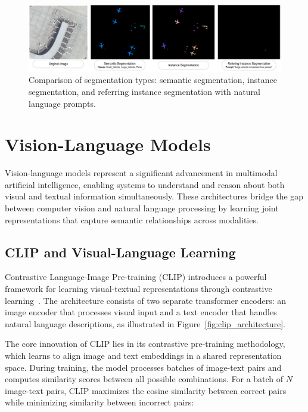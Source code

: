 \begin{figure}[htbp]
\centering
\includegraphics[width=1.0\textwidth]{Images/segmentation.png}
\caption{Comparison of segmentation types: semantic segmentation, instance segmentation, and referring instance segmentation with natural language prompts.}
\label{fig:segmentation}
\end{figure}

\section{Vision-Language Models}

Vision-language models represent a significant advancement in multimodal artificial intelligence, enabling systems to understand and reason about both visual and textual information simultaneously. These architectures bridge the gap between computer vision and natural language processing by learning joint representations that capture semantic relationships across modalities.

\subsection{CLIP and Visual-Language Learning}

Contrastive Language-Image Pre-training (CLIP) introduces a powerful framework for learning visual-textual representations through contrastive learning~\cite{clip}. The architecture consists of two separate transformer encoders: an image encoder that processes visual input and a text encoder that handles natural language descriptions, as illustrated in Figure~\ref{fig:clip_architecture}.

The core innovation of CLIP lies in its contrastive pre-training methodology, which learns to align image and text embeddings in a shared representation space. During training, the model processes batches of image-text pairs and computes similarity scores between all possible combinations. For a batch of $N$ image-text pairs, CLIP maximizes the cosine similarity between correct pairs while minimizing similarity between incorrect pairs:

